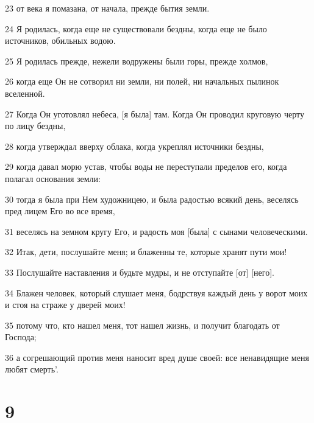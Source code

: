 \par 23 от века я помазана, от начала, прежде бытия земли.
\par 24 Я родилась, когда еще не существовали бездны, когда еще не было источников, обильных водою.
\par 25 Я родилась прежде, нежели водружены были горы, прежде холмов,
\par 26 когда еще Он не сотворил ни земли, ни полей, ни начальных пылинок вселенной.
\par 27 Когда Он уготовлял небеса, [я была] там. Когда Он проводил круговую черту по лицу бездны,
\par 28 когда утверждал вверху облака, когда укреплял источники бездны,
\par 29 когда давал морю устав, чтобы воды не переступали пределов его, когда полагал основания земли:
\par 30 тогда я была при Нем художницею, и была радостью всякий день, веселясь пред лицем Его во все время,
\par 31 веселясь на земном кругу Его, и радость моя [была] с сынами человеческими.
\par 32 Итак, дети, послушайте меня; и блаженны те, которые хранят пути мои!
\par 33 Послушайте наставления и будьте мудры, и не отступайте [от] [него].
\par 34 Блажен человек, который слушает меня, бодрствуя каждый день у ворот моих и стоя на страже у дверей моих!
\par 35 потому что, кто нашел меня, тот нашел жизнь, и получит благодать от Господа;
\par 36 а согрешающий против меня наносит вред душе своей: все ненавидящие меня любят смерть'.

\chapter{9}

